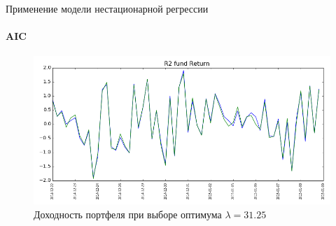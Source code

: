 \documentclass[11pt]{beamer}
\begin{document}
\begin{frame}{Применение модели нестационарной регрессии}
\framesubtitle{AIC}
\begin{figure}
\centering
\includegraphics[scale=0.4]{aic_return.png}
\caption{Доходность портфеля при выборе оптимума $\lambda=31.25$}
\end{figure}
\end{frame}
\end{document}
